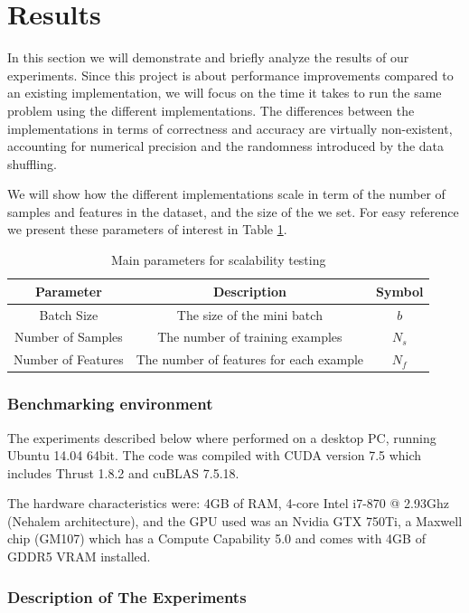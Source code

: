 \documentclass[11pt,a4paper]{article}
\begin{document}
\section{Results}
\label{sec:results}

In this section we will demonstrate and briefly analyze the results of our experiments.
Since this project is about performance improvements compared
to an existing implementation, we will focus on the time it takes to run the same problem
using the different implementations. The differences between
the implementations in terms of correctness and accuracy are virtually non-existent, accounting
for numerical precision and the randomness introduced by the data shuffling.

We will show how the different implementations scale in term of the number of samples
and features in the dataset, and the size of the we set. For easy 
reference we present these parameters of interest in Table \ref{table:parameters}.


\begin{table}[H]
\centering
\begin{tabular}{|c|c|c|}
\hline
Parameter & Description & Symbol\\
\hline
Batch Size & The size of the mini batch & $b$ \\
\hline
Number of Samples & The number of training examples & $N_s$ \\
\hline
Number of Features & The number of features for each example & $N_f$ \\
\hline
\end{tabular}
\caption{Main parameters for scalability testing}
\label{table:parameters}
\end{table}

\subsubsection*{Benchmarking environment}
The experiments described below where performed on a desktop PC,
running Ubuntu 14.04 64bit. The code was compiled with CUDA version 7.5 which includes Thrust 1.8.2
and cuBLAS 7.5.18.

The hardware characteristics were: 4GB of RAM,
4-core Intel i7-870 @ 2.93Ghz (Nehalem architecture), and the GPU used was an Nvidia GTX
750Ti, a Maxwell chip (GM107) which has a Compute Capability 5.0 and comes with
4GB of GDDR5 VRAM installed.

\subsubsection*{Description of The Experiments}
\end{document}
